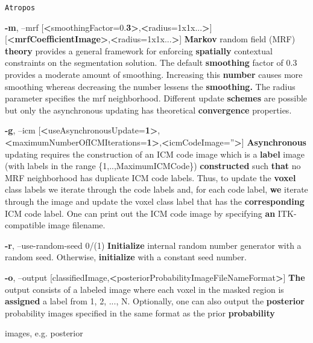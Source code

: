 \documentclass[ignorenonframetext,]{beamer}
\newenvironment{Shaded}{\begin{snugshade}}{\end{snugshade}}
\newcommand{\KeywordTok}[1]{\textcolor[rgb]{0.13,0.29,0.53}{\textbf{{#1}}}}
\newcommand{\DataTypeTok}[1]{\textcolor[rgb]{0.13,0.29,0.53}{{#1}}}
\newcommand{\StringTok}[1]{\textcolor[rgb]{0.31,0.60,0.02}{{#1}}}
\newcommand{\NormalTok}[1]{{#1}}
\begin{document}
\begin{frame}[fragile]{\texttt{Atropos}}
\begin{Shaded}
\begin{Highlighting}[]
     \KeywordTok{-m}\NormalTok{, --mrf [}\KeywordTok{<}\NormalTok{smoothingFactor=0.}\KeywordTok{3>}\NormalTok{,}\KeywordTok{<}\NormalTok{radius=1x1x...}\KeywordTok{>}\NormalTok{]}
               \NormalTok{[}\KeywordTok{<mrfCoefficientImage>}\NormalTok{,}\KeywordTok{<}\NormalTok{radius=1x1x...}\KeywordTok{>}\NormalTok{]}
          \KeywordTok{Markov} \NormalTok{random field (MRF) }\KeywordTok{theory} \NormalTok{provides a general framework for enforcing}
          \KeywordTok{spatially} \NormalTok{contextual constraints on the segmentation solution. The default}
          \KeywordTok{smoothing} \NormalTok{factor of 0.3 provides a moderate amount of smoothing. Increasing this}
          \KeywordTok{number} \NormalTok{causes more smoothing whereas decreasing the number lessens the}
          \KeywordTok{smoothing.} \NormalTok{The radius parameter specifies the mrf neighborhood. Different update}
          \KeywordTok{schemes} \NormalTok{are possible but only the asynchronous updating has theoretical}
          \KeywordTok{convergence} \NormalTok{properties.}

     \KeywordTok{-g}\NormalTok{, --icm [}\KeywordTok{<}\NormalTok{useAsynchronousUpdate=}\KeywordTok{1>}\NormalTok{,}\KeywordTok{<}\NormalTok{maximumNumberOfICMIterations=}\KeywordTok{1>}\NormalTok{,}\KeywordTok{<}\NormalTok{icmCodeImage=}\StringTok{''}\KeywordTok{>}\NormalTok{]}
          \KeywordTok{Asynchronous} \NormalTok{updating requires the construction of an ICM code image which is a}
          \KeywordTok{label} \NormalTok{image (with labels in the range }\DataTypeTok{\{1,..,MaximumICMCode\}}\NormalTok{) }\KeywordTok{constructed} \NormalTok{such}
          \KeywordTok{that} \NormalTok{no MRF neighborhood has duplicate ICM code labels. Thus, to update the}
          \KeywordTok{voxel} \NormalTok{class labels we iterate through the code labels and, for each code label,}
          \KeywordTok{we} \NormalTok{iterate through the image and update the voxel class label that has the}
          \KeywordTok{corresponding} \NormalTok{ICM code label. One can print out the ICM code image by specifying}
          \KeywordTok{an} \NormalTok{ITK-compatible image filename.}

     \KeywordTok{-r}\NormalTok{, --use-random-seed 0/(1)}
          \KeywordTok{Initialize} \NormalTok{internal random number generator with a random seed. Otherwise,}
          \KeywordTok{initialize} \NormalTok{with a constant seed number.}

     \KeywordTok{-o}\NormalTok{, --output [classifiedImage,}\KeywordTok{<}\NormalTok{posteriorProbabilityImageFileNameFormat}\KeywordTok{>}\NormalTok{]}
          \KeywordTok{The} \NormalTok{output consists of a labeled image where each voxel in the masked region is}
          \KeywordTok{assigned} \NormalTok{a label from 1, 2, ..., N. Optionally, one can also output the}
          \KeywordTok{posterior} \NormalTok{probability images specified in the same format as the prior}
          \KeywordTok{probability} \NormalTok{images, e.g. posterior%

}
\end{Highlighting}
\end{Shaded}
\end{frame}
\end{document}
